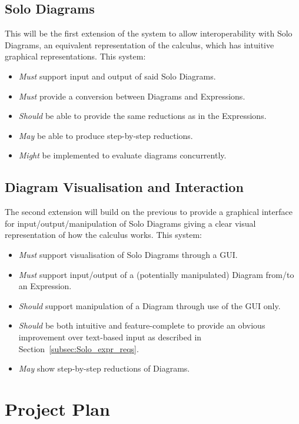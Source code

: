 \documentclass{article}
\begin{document}
\subsection{Solo Diagrams}
This will be the first extension of the system to allow interoperability with Solo Diagrams, an equivalent representation of the calculus, which has intuitive graphical representations.
This system:
\begin{itemize}
	\item \textit{Must} support input and output of said Solo Diagrams.
	\item \textit{Must} provide a conversion between Diagrams and Expressions.
	\item \textit{Should} be able to provide the same reductions as in the Expressions.
	\item \textit{May} be able to produce step-by-step reductions.
	\item \textit{Might} be implemented to evaluate diagrams concurrently.
\end{itemize}

\subsection{Diagram Visualisation and Interaction}
The second extension will build on the previous to provide a graphical interface for input/output/manipulation of Solo Diagrams giving a clear visual representation of how the calculus works.
This system:
\begin{itemize}
	\item \textit{Must} support visualisation of Solo Diagrams through a GUI\@.
	\item \textit{Must} support input/output of a (potentially manipulated) Diagram from/to an Expression.
	\item \textit{Should} support manipulation of a Diagram through use of the GUI only.
	\item \textit{Should} be both intuitive and feature-complete to provide an obvious improvement over text-based input as described in Section~\ref{subsec:Solo_expr_reqs}.
	\item \textit{May} show step-by-step reductions of Diagrams.
\end{itemize}


\section{Project Plan}
\end{document}
